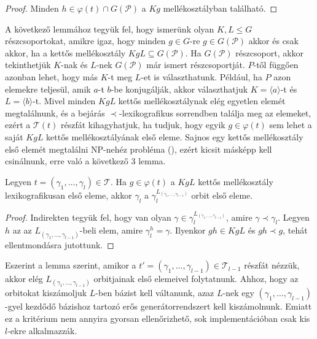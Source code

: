 \begin{proof}
Minden $h \in \varphi(t) \cap G(\mathcal{P})$ a $Kg$ mellékosztályban található.
\end{proof}
A következő lemmához tegyük fel, hogy ismerünk olyan $K, L \le G$ részcsoportokat, amikre igaz, hogy minden $g \in G$-re $g \in G(\mathcal{P})$ akkor és csak akkor, ha a kettős mellékosztály $KgL \subseteq G(\mathcal{P})$.
Ha $G(\mathcal{P})$ részcsoport, akkor tekinthetjük $K$-nak és $L$-nek $G(\mathcal{P})$ már ismert részcsoportját.
$P$-től függően azonban lehet, hogy más $K$-t meg $L$-et is választhatunk.
Például, ha $P$ azon elemekre teljesül, amik $a$-t $b$-be konjugálják, akkor választhatjuk $K=\langle a \rangle$-t és $L=\langle b \rangle$-t.
Mivel minden $KgL$ kettős mellékosztálynak elég egyetlen elemét megtalálnunk, és a bejárás $\prec$-lexikografikus sorrendben találja meg az elemeket, ezért a $\mathcal{T}(t)$ részfát kihagyhatjuk, ha tudjuk, hogy
egyik $g \in \varphi(t)$ sem lehet a saját $KgL$ kettős mellékosztályának első eleme.
Sajnos egy kettős mellékosztály első elemét megtalálni NP-nehéz probléma (\cite{Luk93}), ezért kicsit másképp kell csinálnunk, erre való a következő 3 lemma.

\begin{lemma}
\label{thm:permbtcrit2}
Legyen $t = (\gamma_1, \dots, \gamma_l) \in \mathcal{T}$.
Ha $g \in \varphi(t)$ a $KgL$ kettős mellékosztály lexikografikusan első eleme, akkor $\gamma_l$ a $\gamma_l^{L_{(\gamma_1,\dots,\gamma_{l-1})}}$ orbit első eleme.
\end{lemma}
\begin{proof}
Indirekten tegyük fel, hogy van olyan $\gamma \in \gamma_l^{L_{(\gamma_1,\dots,\gamma_{l-1})}}$, amire $\gamma \prec \gamma_l$.
Legyen $h$ az az $L_{(\gamma_1,\dots,\gamma_{l-1})}$-beli elem, amire $\gamma_l^h = \gamma$.
Ilyenkor $gh \in KgL$ és $gh \prec g$, tehát ellentmondásra jutottunk.
\end{proof}
Eszerint a lemma szerint, amikor a $t' = (\gamma_1, \dots, \gamma_{l-1}) \in \mathcal{T}_{l-1}$ részfát nézzük, akkor elég $L_{(\gamma_1,\dots,\gamma_{l-1})}$ orbitjainak első elemeivel folytatnunk.
Ahhoz, hogy az orbitokat kiszámoljuk $L$-ben bázist kell váltanunk, azaz $L$-nek egy $(\gamma_1,\dots,\gamma_{l-1})$-gyel kezdődő bázishoz tartozó erős generátorrendszert kell kiszámolnunk.
Emiatt ez a kritérium nem annyira gyorsan ellenőrizhető, sok implementációban csak kis $l$-ekre alkalmazzák.

